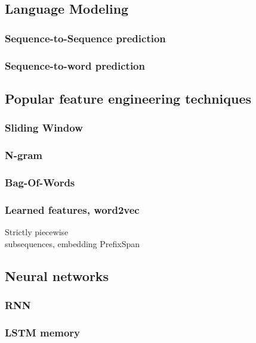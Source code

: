 \subsection{Language Modeling}
\subsubsection{Sequence-to-Sequence prediction}
\subsubsection{Sequence-to-word prediction}

\subsection{Popular feature engineering techniques}
\subsubsection{Sliding Window}
\subsubsection{N-gram}
\subsubsection{Bag-Of-Words}
\subsubsection{Learned features, word2vec}
Strictly piecewise\\
subsequences, embedding
PrefixSpan

\subsection{Neural networks}
\subsubsection{RNN}
\subsubsection{LSTM memory}